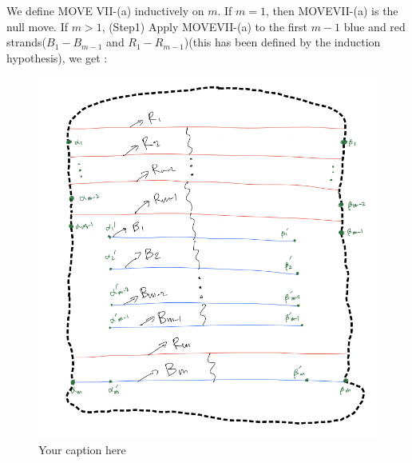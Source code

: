 We define MOVE \RN{7}-(a) inductively on $m$.
If $m=1$, then MOVE\RN{7}-(a) is the null move. If $m>1$,
(Step1) Apply MOVE\RN{7}-(a) to the first $m-1$ blue and red strands($B_1 - B_{m-1}$ and $R_1 - R_{m-1}$)(this has been defined by the induction hypothesis), we get :

\begin{figure}[H] %
    \centering
    \includegraphics[width=\linewidth]{diagrams/definition7/3.png} %
    \caption{Your caption here}
    \label{fig:your-label}
\end{figure}

